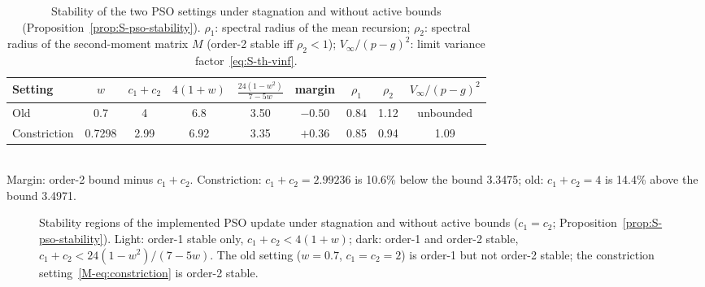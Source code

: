 \begin{table}[!htbp]
\centering
\caption{Stability of the two PSO settings under stagnation and without active bounds (Proposition~\ref{prop:S-pso-stability}). $\rho_1$: spectral radius of the mean recursion; $\rho_2$: spectral radius of the second-moment matrix $M$ (order-2 stable iff $\rho_2<1$); $V_\infty/(p-g)^2$: limit variance factor~\eqref{eq:S-th-vinf}.}
\label{tab:S-th-settings}
\begin{tabular}{lcccccccc}
\toprule
Setting & $w$ & $c_1+c_2$ & $4(1+w)$ & $\frac{24(1-w^2)}{7-5w}$ & margin & $\rho_1$ & $\rho_2$ & $V_\infty/(p-g)^2$\\
\midrule
Old & 0.7 & 4 & 6.8 & 3.50 & $-0.50$ & 0.84 & 1.12 & unbounded\\
Constriction & 0.7298 & 2.99 & 6.92 & 3.35 & $+0.36$ & 0.85 & 0.94 & 1.09\\
\bottomrule
\end{tabular}
\\[2pt]{\footnotesize Margin: order-2 bound minus $c_1+c_2$. Constriction: $c_1+c_2=2.99236$ is 10.6\% below the bound 3.3475; old: $c_1+c_2=4$ is 14.4\% above the bound 3.4971.}
\end{table}

\begin{figure}[!htbp]
\centering
{}
\caption{Stability regions of the implemented PSO update under stagnation and without active bounds ($c_1=c_2$; Proposition~\ref{prop:S-pso-stability}). Light: order-1 stable only, $c_1+c_2<4(1+w)$; dark: order-1 and order-2 stable, $c_1+c_2<24(1-w^2)/(7-5w)$. The old setting ($w=0.7$, $c_1=c_2=2$) is order-1 but not order-2 stable; the constriction setting~\eqref{M-eq:constriction} is order-2 stable.}
\label{fig:S-th-stability}
\end{figure}


